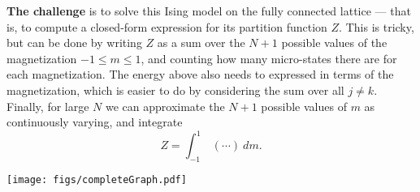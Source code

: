\documentclass[12 pt]{article} %
\begin{document}
\textbf{The challenge} is to solve this Ising model on the fully connected lattice --- that is, to compute a closed-form expression for its partition function $Z$.
This is tricky, but can be done by writing $Z$ as a sum over the $N + 1$ possible values of the magnetization $-1 \leq m \leq 1$, and counting how many micro-states there are for each magnetization.
The energy above also needs to expressed in terms of the magnetization, which is easier to do by considering the sum over all $j \neq k$.
Finally, for large $N$ we can approximate the $N + 1$ possible values of $m$ as continuously varying, and integrate
\begin{equation*}
  Z = \int_{-1}^1 \ (\cdots) \ dm.
\end{equation*}

\begin{center}\texttt{[image: figs/completeGraph.pdf]}\end{center}
\end{document}
